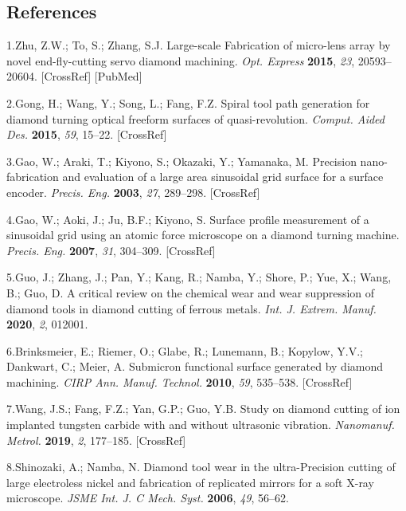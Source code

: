 \documentclass{article}
\begin{document}

\subsection*{References}

\begin{hangpars}\small
1.\enspace Zhu, Z.W.; To, S.; Zhang, S.J. Large-scale Fabrication of micro-lens array by novel end-fly-cutting servo diamond machining. \emph{Opt. Express} \textbf{2015}, \emph{23}, 20593–20604. [CrossRef] [PubMed]

2.\enspace Gong, H.; Wang, Y.; Song, L.; Fang, F.Z. Spiral tool path generation for diamond turning optical freeform surfaces of quasi-revolution. \emph{Comput. Aided Des.} \textbf{2015}, \emph{59}, 15–22. [CrossRef]

3.\enspace Gao, W.; Araki, T.; Kiyono, S.; Okazaki, Y.; Yamanaka, M. Precision nano-fabrication and evaluation of a large area sinusoidal grid surface for a surface encoder. \emph{Precis. Eng.} \textbf{2003}, \emph{27}, 289–298. [CrossRef]

4.\enspace Gao, W.; Aoki, J.; Ju, B.F.; Kiyono, S. Surface profile measurement of a sinusoidal grid using an atomic force microscope on a diamond turning machine. \emph{Precis. Eng.} \textbf{2007}, \emph{31}, 304–309. [CrossRef]

5.\enspace Guo, J.; Zhang, J.; Pan, Y.; Kang, R.; Namba, Y.; Shore, P.; Yue, X.; Wang, B.; Guo, D. A critical review on the chemical wear and wear suppression of diamond tools in diamond cutting of ferrous metals. \emph{Int. J. Extrem. Manuf.} \textbf{2020}, \emph{2}, 012001.

6.\enspace Brinksmeier, E.; Riemer, O.; Glabe, R.; Lunemann, B.; Kopylow, Y.V.; Dankwart, C.; Meier, A. Submicron functional surface generated by diamond machining. \emph{CIRP Ann. Manuf. Technol.} \textbf{2010}, \emph{59}, 535–538. [CrossRef]

7.\enspace Wang, J.S.; Fang, F.Z.; Yan, G.P.; Guo, Y.B. Study on diamond cutting of ion implanted tungsten carbide with and without ultrasonic vibration. \emph{Nanomanuf. Metrol.} \textbf{2019}, \emph{2}, 177–185. [CrossRef]

8.\enspace Shinozaki, A.; Namba, N. Diamond tool wear in the ultra-Precision cutting of large electroless nickel and fabrication of replicated mirrors for a soft X-ray microscope. \emph{JSME Int. J. C Mech. Syst.} \textbf{2006}, \emph{49}, 56–62.


\end{hangpars}
\end{document}
